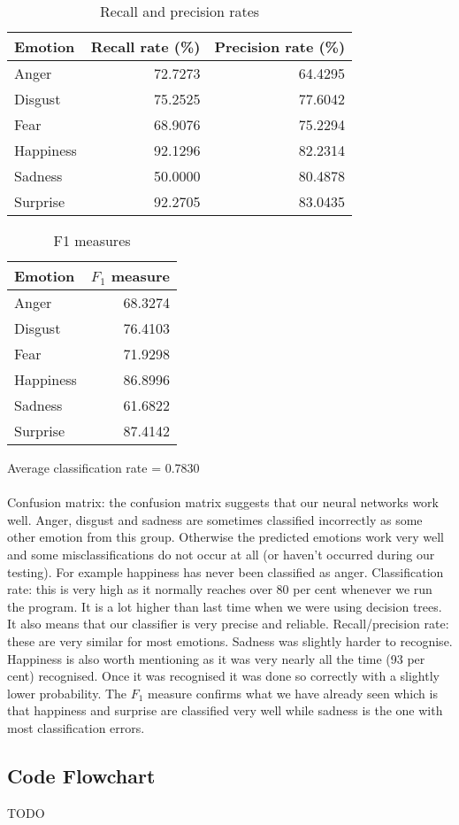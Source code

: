 \documentclass[12pt]{article}
\begin{document}
\begin{table}
\centering
\begin{tabular}{l | r r}
Emotion & Recall rate (\%) & Precision rate (\%) \\
\hline
Anger     & 72.7273 & 64.4295 \\
Disgust   & 75.2525 & 77.6042 \\
Fear      & 68.9076 & 75.2294 \\
Happiness & 92.1296 & 82.2314 \\
Sadness   & 50.0000 & 80.4878 \\
Surprise  & 92.2705 & 83.0435 \\
\end{tabular}
\caption{Recall and precision rates}
\end{table}

\begin{table}
\centering
\begin{tabular}{l | r}
Emotion & \( F_1 \) measure \\
\hline
Anger     & 68.3274 \\
Disgust   & 76.4103 \\
Fear      & 71.9298 \\
Happiness & 86.8996 \\
Sadness   & 61.6822 \\
Surprise  & 87.4142 \\
\end{tabular}
\caption{F1 measures}
\end{table}

Average classification rate = 0.7830 \\ \\

Confusion matrix: the confusion matrix suggests that our neural networks work well. Anger, disgust and sadness are sometimes classified incorrectly as some other emotion from this group. Otherwise the predicted emotions work very well and some misclassifications do not occur at all (or haven't occurred during our testing). For example happiness has never been classified as anger. Classification rate: this is very high as it normally reaches over 80 per cent whenever we run the program. It is a lot higher than last time when we were using decision trees. It also means that our classifier is very precise and reliable. Recall/precision rate: these are very similar for most emotions. Sadness was slightly harder to recognise. Happiness is also worth mentioning as it was very nearly all the time (93 per cent) recognised. Once it was recognised it was done so correctly with a slightly lower probability. The $F_1$ measure confirms what we have already seen which is that happiness and surprise are classified very well while sadness is the one with most classification errors.


\newpage
\subsection*{Code Flowchart}

TODO
\end{document}

